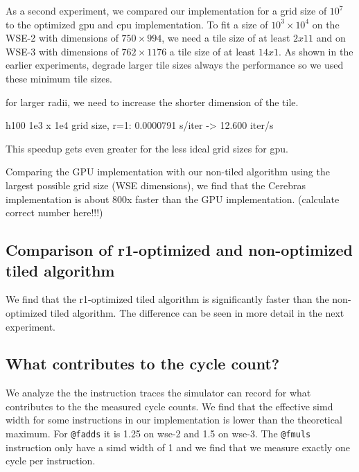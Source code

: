 \documentclass{article}
\begin{document}
As a second experiment, we compared our implementation for a grid size of $10^7$ to the optimized gpu and cpu implementation. To fit a size of $10^3\times10^4$ on the WSE-2 with dimensions of $750\times994$, we need a tile size of at least $2x11$ and on WSE-3 with dimensions of $762\times1176$ a tile size of at least $14x1$. As shown in the earlier experiments, degrade larger tile sizes always the performance so we used these minimum tile sizes.




for larger radii, we need to increase the shorter dimension of the tile.



h100 1e3 x 1e4 grid size, r=1: 0.0000791 s/iter -> 12.600 iter/s





This speedup gets even greater for the less ideal grid sizes for gpu.

Comparing the GPU implementation with our non-tiled algorithm using the largest possible grid size (WSE dimensions), we find that the Cerebras implementation is about 800x faster than the GPU implementation. (calculate correct number here!!!)

\subsection{Comparison of r1-optimized and non-optimized tiled algorithm}
We find that the r1-optimized tiled algorithm is significantly faster than the non-optimized tiled algorithm.
The difference can be seen in more detail in the next experiment.

\subsection{What contributes to the cycle count?}
We analyze the the instruction traces the simulator can record for what contributes to the the measured cycle counts.
We find that the effective simd width for some instructions in our implementation is lower than the theoretical maximum.
For \texttt{@fadds} it is 1.25 on wse-2 and 1.5 on wse-3.
The \texttt{@fmuls} instruction only have a simd width of 1 and we find that we measure exactly one cycle per instruction.
\end{document}
